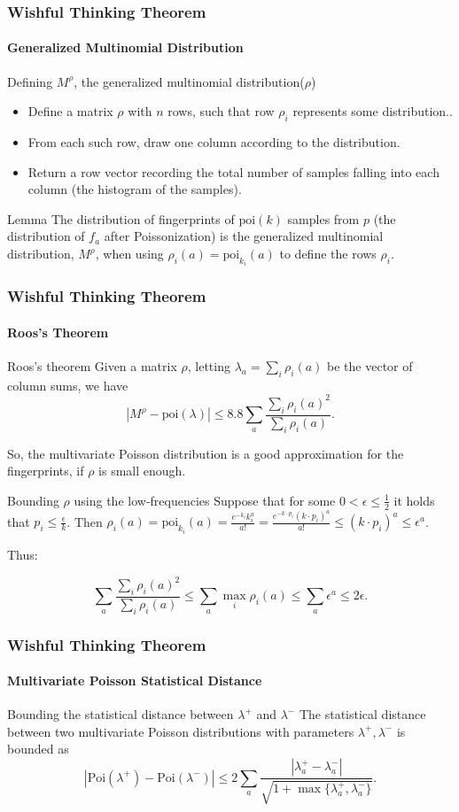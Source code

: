 \documentclass{beamer}
\newcommand{\eps}{\epsilon} \newcommand{\lam}{\lambda}
\begin{document}
\begin{frame}
  \frametitle{Wishful Thinking Theorem} \framesubtitle{Generalized
    Multinomial Distribution}
\begin{block}{Defining $M^\rho$, the generalized multinomial distribution($\rho$)}
  
  \begin{itemize}
  \item Define a matrix $\rho$ with $n$ rows, such that row $\rho_i$ represents some distribution..
\item From each such row, draw one column according to the distribution. 
\item Return a row vector recording the total number of samples falling into each column (the histogram of the samples).
\end{itemize}
\end{block}

\begin{block}{Lemma}
The distribution of fingerprints of $\mbox{poi}(k)$ samples from $p$ (the distribution of $f_a$ after Poissonization) is the generalized multinomial distribution, $M^\rho$, when using $\rho_i(a)=\mbox{poi}_{k_i}(a)$ to define the rows $\rho_i$.
\end{block}
\end{frame}

\begin{frame}
  \frametitle{Wishful Thinking Theorem} \framesubtitle{Roos's Theorem}
  \begin{block}{Roos's theorem}
  Given a matrix $\rho$, letting $\lambda_a=\sum_i\rho_i(a)$ be the vector of column sums, we have
$$ |M^\rho-\mbox{poi}(\lambda)|\le 8.8\sum_a\frac{\sum_i\rho_i(a)^2}{\sum_i \rho_i(a)}.$$\end{block}
So, the multivariate Poisson distribution is a good approximation for the fingerprints, if $\rho$ is small enough.
\begin{block}{Bounding $\rho$ using the low-frequencies}
Suppose that for some $0<\eps\le\frac{1}{2}$ it holds that $p_i\le \frac{\eps}{k}$. Then
$\rho_i(a)=\mbox{poi}_{k_i}(a)=\frac{e^{-k_i}k_i^a}{a!}=\frac{e^{-k\cdot p_i}(k\cdot p_i)^a}{a!}\le (k\cdot p_i)
^a\le \eps^a$. 

Thus: 

$$\sum_a\frac{\sum_i\rho_i(a)^2}{\sum_i \rho_i(a)}\le \sum_a\max_i \rho_i(a)\le \sum_a \eps^a\le 2\eps. $$
  \end{block}
\end{frame}


\begin{frame}
  \frametitle{Wishful Thinking Theorem} \framesubtitle{Multivariate
    Poisson Statistical Distance}  
    \begin{block}{Bounding the statistical distance between $\lambda^+$ and $\lambda^-$}
 The statistical distance between two multivariate Poisson distributions with parameters $\lambda^+, \lambda^-$ is bounded as
$$|\mbox{Poi}(\lambda^+)-\mbox{Poi}(\lambda^-)|\le 2\sum_a\frac{|\lambda^+_a-\lambda^-_a|}{\sqrt{1+\max\{\lambda^+_a,\lambda_a^-\}}}.$$
    \end{block}
\end{frame}
\end{document}
